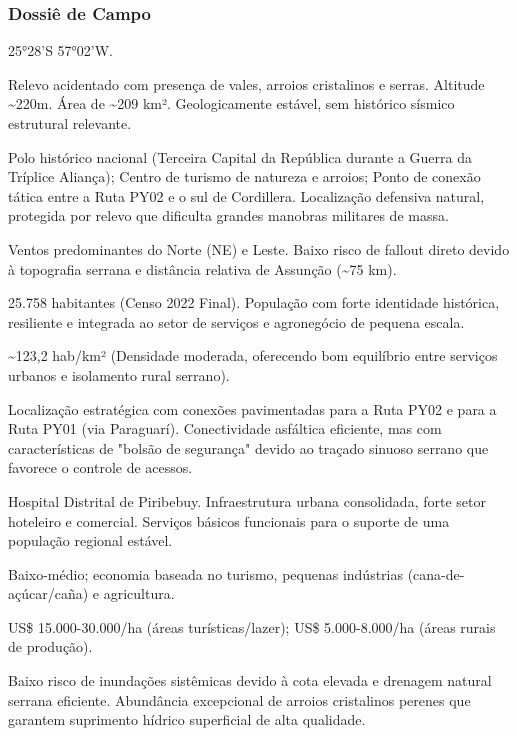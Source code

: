 \subsubsection{Dossiê de Campo}
\begin{description}[style=nextline,leftmargin=0.5cm,font=\bfseries]
\item[Coordenadas]  25°28'S 57°02'W.
\item[Topografia]  Relevo acidentado com presença de vales, arroios cristalinos e serras. Altitude \textasciitilde 220m. Área de \textasciitilde 209 km². Geologicamente estável, sem histórico sísmico estrutural relevante.
\item[Alvos Estratégicos]  Polo histórico nacional (Terceira Capital da República durante a Guerra da Tríplice Aliança); Centro de turismo de natureza e arroios; Ponto de conexão tática entre a Ruta PY02 e o sul de Cordillera. Localização defensiva natural, protegida por relevo que dificulta grandes manobras militares de massa.
\item[Fallout]  Ventos predominantes do Norte (NE) e Leste. Baixo risco de fallout direto devido à topografia serrana e distância relativa de Assunção (\textasciitilde 75 km).
\item[População]  25.758 habitantes (Censo 2022 Final). População com forte identidade histórica, resiliente e integrada ao setor de serviços e agronegócio de pequena escala.
\item[Densidade]  \textasciitilde 123,2 hab/\allowbreak km² (Densidade moderada, oferecendo bom equilíbrio entre serviços urbanos e isolamento rural serrano).
\item[Vias de Acesso]  Localização estratégica com conexões pavimentadas para a Ruta PY02 e para a Ruta PY01 (via Paraguarí). Conectividade asfáltica eficiente, mas com características de "bolsão de segurança" devido ao traçado sinuoso serrano que favorece o controle de acessos.
\item[Serviços]  Hospital Distrital de Piribebuy. Infraestrutura urbana consolidada, forte setor hoteleiro e comercial. Serviços básicos funcionais para o suporte de uma população regional estável.
\item[Custo de Vida]  Baixo-médio; economia baseada no turismo, pequenas indústrias (cana-de-açúcar/\allowbreak caña) e agricultura.
\item[Preço da Terra]  US\$ 15.000-30.000/\allowbreak ha (áreas turísticas/\allowbreak lazer); US\$ 5.000-8.000/\allowbreak ha (áreas rurais de produção).
\item[Hidrologia]  Baixo risco de inundações sistêmicas devido à cota elevada e drenagem natural serrana eficiente. Abundância excepcional de arroios cristalinos perenes que garantem suprimento hídrico superficial de alta qualidade.

\end{description}
